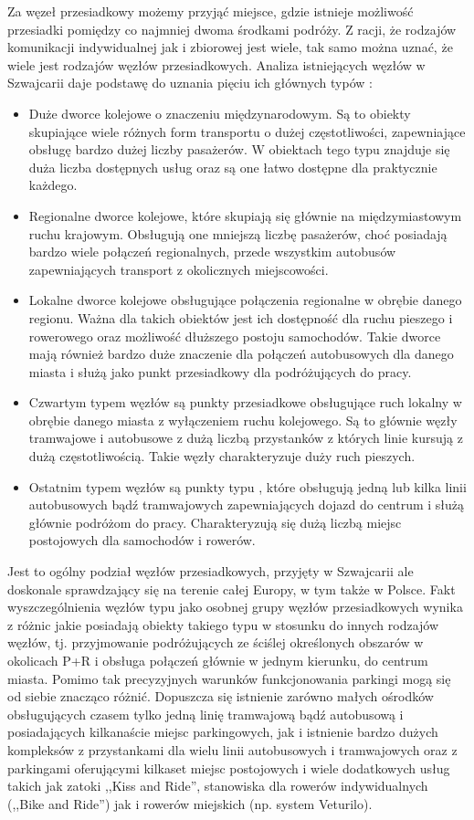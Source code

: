 \documentclass[twoside,12pt]{article}
\begin{document}
	Za węzeł przesiadkowy możemy przyjąć miejsce, gdzie istnieje możliwość przesiadki pomiędzy co najmniej dwoma środkami podróży. Z racji, że rodzajów komunikacji indywidualnej jak i zbiorowej jest wiele, tak samo można uznać, że wiele jest rodzajów węzłów przesiadkowych. Analiza istniejących węzłów w Szwajcarii daje podstawę do uznania pięciu ich głównych typów \cite{standardy_szwajcarskie}:
	\begin{itemize}
		\item Duże dworce kolejowe o znaczeniu międzynarodowym. Są to obiekty skupiające wiele różnych form transportu o dużej częstotliwości, zapewniające obsługę bardzo dużej liczby pasażerów. W obiektach tego typu znajduje się duża liczba dostępnych usług oraz są one łatwo dostępne dla praktycznie każdego.
		\item Regionalne dworce kolejowe, które skupiają się głównie na międzymiastowym ruchu krajowym. Obsługują one mniejszą liczbę pasażerów, choć posiadają bardzo wiele połączeń regionalnych, przede wszystkim autobusów zapewniających transport z okolicznych miejscowości.
		\item Lokalne dworce kolejowe obsługujące połączenia regionalne w obrębie danego regionu. Ważna dla takich obiektów jest ich dostępność dla ruchu pieszego i rowerowego oraz możliwość dłuższego postoju samochodów. Takie dworce mają również bardzo duże znaczenie dla połączeń autobusowych dla danego miasta i służą jako punkt przesiadkowy dla podróżujących do pracy. 
		\item Czwartym typem węzłów są punkty przesiadkowe obsługujące ruch lokalny w obrębie danego miasta z wyłączeniem ruchu kolejowego. Są to głównie węzły tramwajowe i autobusowe z dużą liczbą przystanków z których linie kursują z dużą częstotliwością. Takie węzły charakteryzuje duży ruch pieszych. 
		\item Ostatnim typem węzłów są punkty typu \pnr{}, które obsługują jedną lub kilka linii autobusowych bądź tramwajowych zapewniających dojazd do centrum i służą głównie podróżom do pracy. Charakteryzują się dużą liczbą miejsc postojowych dla samochodów i rowerów.
	\end{itemize}
	
		Jest to ogólny podział węzłów przesiadkowych, przyjęty w Szwajcarii ale doskonale sprawdzający się na terenie całej Europy, w tym także w Polsce. Fakt wyszczególnienia węzłów typu \pnr{} jako osobnej grupy węzłów przesiadkowych wynika z różnic jakie posiadają obiekty takiego typu w stosunku do innych rodzajów węzłów, tj. przyjmowanie podróżujących ze ściślej określonych obszarów w okolicach P+R i obsługa połączeń głównie w jednym kierunku, do centrum miasta. Pomimo tak precyzyjnych warunków funkcjonowania parkingi \pnr{} mogą się od siebie znacząco różnić. Dopuszcza się istnienie zarówno małych ośrodków obsługujących czasem tylko jedną linię tramwajową bądź autobusową i posiadających kilkanaście miejsc parkingowych, jak i istnienie bardzo dużych kompleksów z przystankami dla wielu linii autobusowych i tramwajowych oraz z parkingami oferującymi kilkaset miejsc postojowych i wiele dodatkowych usług takich jak zatoki ,,Kiss and Ride'', stanowiska dla rowerów indywidualnych (,,Bike and Ride'') jak i rowerów miejskich (np. system Veturilo). 
\end{document}
